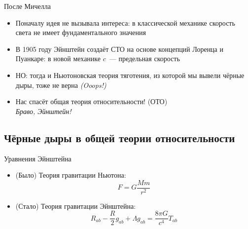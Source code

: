 \documentclass[usenames,dvipsnames,pdftex,unicode,hidelinks]{beamer}
\begin{document}
  \begin{frame}{После Мичелла}
    \begin{itemize}
      \item<1-> Поначалу идея \alert{не вызывала интереса}: в классической механике скорость света не
        имеет фундаментального значения
      \item<2-> В 1905 году Эйнштейн создаёт СТО на основе концепций Лоренца и Пуанкаре: в новой
        механике $c$~--- предельная скорость
      \item<3-> \alert{НО:} тогда и Ньютоновская теория тяготения, из которой мы вывели чёрные дыры,
        тоже не верна \emph{(Ooops!)}
      \item<4-> Нас спасёт \alert{общая теория относительности!} (ОТО)\\
        \emph{Браво, Эйнштейн!}
    \end{itemize}
  \end{frame}

  \subsection{Чёрные дыры в общей теории относительности}

  \begin{frame}{Уравнения Эйнштейна}
    \begin{itemize}[<+->]
      \item (Было) Теория гравитации Ньютона:
        \[
          F = G \frac{Mm}{r^2}
        \]
      \item (Стало) Теория гравитации Эйнштейна:
         \[
           R_{ab} - \frac{R}{2}  g_{ab} + \Lambda g_{ab} = \frac{8 \pi G}{c^4} T_{ab}
         \]
    \end{itemize}
    \begin{flushright}
    \end{flushright}
    
  \end{frame}
\end{document}
